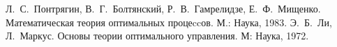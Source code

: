 \documentclass[a4paper, 11pt]{article}
\theoremstyle{definition}
\theoremstyle{plane}
\theoremstyle{remark}
\begin{document}
        

        \tableofcontents
        \clearpage
        
        
        

        \begin{thebibliography}{9}
                 Л.~С.~Понтрягин, В.~Г.~Болтянский, Р.~В.~Гамрелидзе, Е.~Ф.~Мищенко. Математическая теория оптимальных процеccов. М.: Наука, 1983.
                 Э.~Б.~Ли, Л.~Маркус. Основы теории оптимального управления. М: Наука, 1972.
        \end{thebibliography} 
\end{document}
